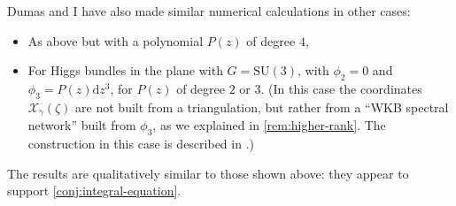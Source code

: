 \documentclass[12pt,letterpaper,reqno]{article}
\numberwithin{equation}{section}
\newcommand{\cX}{\ensuremath{\mathcal X}}
\newcommand{\de}{\mathrm{d}}
\newcommand{\SU}{\mathrm{SU}}
\begin{document}


Dumas and I have also made similar numerical calculations in other
cases:
\begin{itemize}
  \item As above but with a polynomial $P(z)$ of degree $4$,
  \item For Higgs bundles in the plane with $G = \SU(3)$, 
  with $\phi_2 = 0$ and $\phi_3 = P(z) \de z^3$, for $P(z)$ of degree $2$ or $3$. (In this case the coordinates $\cX_\gamma(\zeta)$ 
  are not built from a triangulation, 
  but rather from a ``WKB spectral network'' built from $\phi_3$,
  as we explained in \autoref{rem:higher-rank}.
  The construction in this case is described in \cite{Neitzke:2017yos}.)
\end{itemize}
The results are qualitatively similar to those shown above: they appear to
support \autoref{conj:integral-equation}.

\printbibliography
\end{document}
